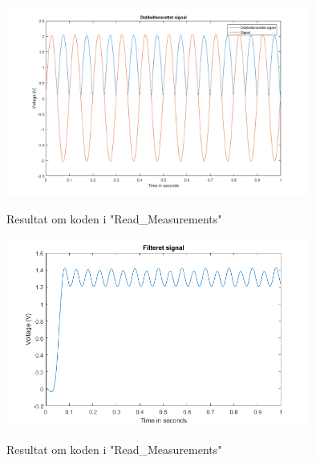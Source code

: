 \begin{figure}[H] 
\centering
{\includegraphics[width=10cm]
{Figure/modultestprocessEnsrettet}}
\caption{Resultat om koden i "Read\_Measurements"}
\label{fig:modultestprocessEnsrettet}
\end{figure}


\begin{figure}[H] 
\centering
{\includegraphics[width=10cm]
{Figure/modultestprocessFilter}}
\caption{Resultat om koden i "Read\_Measurements"}
\label{fig:modultestprocessFilter}
\end{figure}


